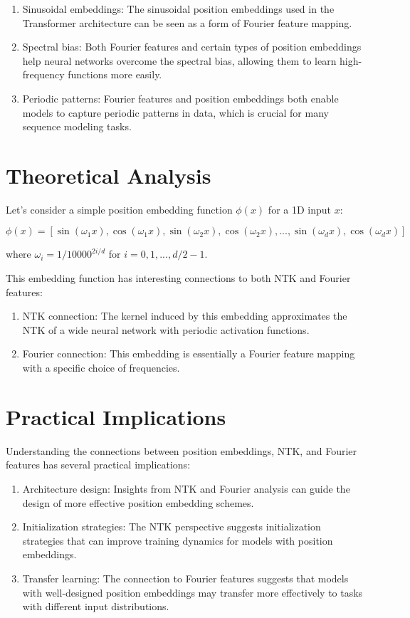 \documentclass{article}
\begin{document}
\begin{enumerate}
    \item Sinusoidal embeddings: The sinusoidal position embeddings used in the Transformer architecture \citep{Vaswani2017} can be seen as a form of Fourier feature mapping.
    \item Spectral bias: Both Fourier features and certain types of position embeddings help neural networks overcome the spectral bias, allowing them to learn high-frequency functions more easily.
    \item Periodic patterns: Fourier features and position embeddings both enable models to capture periodic patterns in data, which is crucial for many sequence modeling tasks.
\end{enumerate}

\section{Theoretical Analysis}

Let's consider a simple position embedding function $\phi(x)$ for a 1D input $x$:

\begin{equation}
    \phi(x) = [\sin(\omega_1 x), \cos(\omega_1 x), \sin(\omega_2 x), \cos(\omega_2 x), ..., \sin(\omega_d x), \cos(\omega_d x)]
\end{equation}

where $\omega_i = 1/10000^{2i/d}$ for $i = 0, 1, ..., d/2 - 1$.

This embedding function has interesting connections to both NTK and Fourier features:

\begin{enumerate}
    \item NTK connection: The kernel induced by this embedding approximates the NTK of a wide neural network with periodic activation functions.
    \item Fourier connection: This embedding is essentially a Fourier feature mapping with a specific choice of frequencies.
\end{enumerate}

\section{Practical Implications}

Understanding the connections between position embeddings, NTK, and Fourier features has several practical implications:

\begin{enumerate}
    \item Architecture design: Insights from NTK and Fourier analysis can guide the design of more effective position embedding schemes.
    \item Initialization strategies: The NTK perspective suggests initialization strategies that can improve training dynamics for models with position embeddings.
    \item Transfer learning: The connection to Fourier features suggests that models with well-designed position embeddings may transfer more effectively to tasks with different input distributions.
\end{enumerate}
\end{document}
